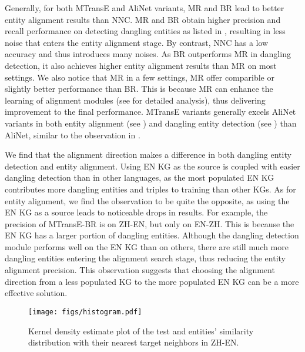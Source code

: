 Generally, for both MTransE and AliNet variants, MR and BR lead to better entity alignment results than NNC. 
MR and BR obtain higher precision and recall performance on detecting dangling entities as listed in , resulting in less noise that enters the entity alignment stage.
By contrast, NNC has a low accuracy and thus introduces many noises.
As BR outperforms MR in dangling detection, it also achieves higher entity alignment results than MR on most settings.
We also notice that MR in a few settings, MR offer comparible or slightly better performance than BR.
This is because MR can enhance the learning of alignment modules (see  for detailed analysis), thus delivering improvement to the final performance. 
MTransE variants generally excels AliNet variants in both entity alignment (see ) and dangling entity detection (see ) than AliNet, similar to the observation in .

We find that the alignment direction makes a difference in both dangling entity detection and entity alignment. 
Using EN KG as the source is coupled with easier dangling detection than in other languages,
as the most populated EN KG contributes more dangling entities and triples to training than other KGs.
As for entity alignment, we find the observation to be quite the opposite, as using the EN KG as a source leads to noticeable drops in results.
For example, the precision of MTransE-BR is  on ZH-EN, but only  on EN-ZH.
This is because the EN KG has a larger portion of dangling entities. 
Although the dangling detection module performs well on the EN KG than on others, there are still much more dangling entities entering the alignment search stage, thus reducing the entity alignment precision.
This observation suggests that choosing the alignment direction from a less populated KG to the more populated EN KG can be a more effective solution.

\begin{figure}[t]
	\centering
	\texttt{[image: figs/histogram.pdf]}
	\caption{Kernel density estimate plot of the test {\color{blue}{matchable}} and {\color{red}{dangling}} entities' similarity distribution with their nearest target neighbors in ZH-EN.}
	\label{fig:viz}
\end{figure}

